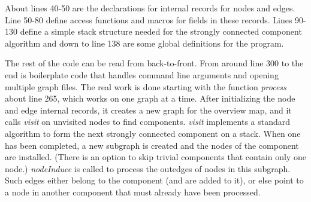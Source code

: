 \documentclass[11pt,letterpaper]{article}
\begin{document}
About lines 40-50 are the declarations for internal records for
nodes and edges.  Line 50-80 define access functions and macros
for fields in these records.  Lines 90-130 define a simple stack
structure needed for the strongly connected component algorithm
and down to line 138 are some global definitions for the program.

The rest of the code can be read from back-to-front. From
around line 300 to the end is boilerplate code that handles
command line arguments and opening multiple graph files. 
The real work is done starting with the function {\it process}
about line 265, which works on one graph at a time.  After initializing
the node and edge internal records, it creates a new graph for the
overview map, and it calls {\it visit} on unvisited nodes to
find components.  {\it visit} implements a standard algorithm to form
the next strongly connected component on a stack.  When one has been
completed, a new subgraph is created and the nodes of the component
are installed.  (There is an option to skip trivial components that
contain only one node.)  {\it nodeInduce} is called to process the
outedges of nodes in this subgraph.  Such edges either belong to
the component (and are added to it), or else point to a node in
another component that must already have been processed.

\end{document}

